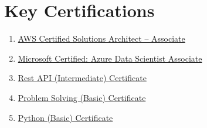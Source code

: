 \documentclass[10pt, letterpaper]{article}
\let\hrefWithoutArrow\href
\renewcommand{\href}[2]{\hrefWithoutArrow{#1}{\mbox{\ifthenelse{\equal{#2}{}}{ }{#2 }\raisebox{.15ex}{\footnotesize \faExternalLink*}}}}
\begin{document}
\section{Key Certifications}
\begin{multicols}{2}
\begin{enumerate}
    \item \hrefWithoutArrow{https://www.credly.com/badges/0e396739-0cd4-45c4-ae53-299f2f493a4b/public_url}{AWS Certified Solutions Architect – Associate}
    \item \hrefWithoutArrow{https://learn.microsoft.com/api/credentials/share/en-gb/MarkAsare/CAC8D0EF0BA894C5?sharingId=D5E81B1623C3EB50}{Microsoft Certified: Azure Data Scientist Associate}
    \item \hrefWithoutArrow{https://www.hackerrank.com/certificates/10cbbd2e7de7}{Rest API (Intermediate) Certificate}
    \item \hrefWithoutArrow{https://www.hackerrank.com/certificates/0ade248f35da}{Problem Solving (Basic) Certificate}
    \item \hrefWithoutArrow{https://www.hackerrank.com/certificates/71e01b8fc02e}{Python (Basic) Certificate}
\end{enumerate}
\end{multicols}
\end{document}
